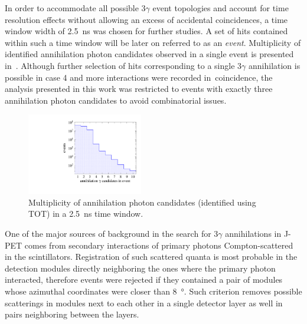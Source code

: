 In order to accommodate all possible $3\gamma$ event topologies and account for time resolution effects without allowing an excess of accidental coincidences, a time window width of 2.5~ns was chosen for further studies. A set of hits contained within such a time window will be later on referred to as an \textit{event}. Multiplicity of identified annihilation photon candidates observed in a single event is presented in~. Although further selection of hits corresponding to a single $3\gamma$ annihilation
is possible
in case 4 and more interactions were recorded in~coincidence,
the analysis presented in this work was restricted to events with exactly three annihilation photon candidates to avoid combinatorial issues.
\begin{figure}[h!]
  \centering
  \includegraphics[width=0.45\textwidth]{Chapter8_analysis_jpet/img/anh_candidates}
  \caption{Multiplicity of annihilation photon candidates (identified using TOT) in a 2.5~ns time window.}\label{fig:hit_multiplicity}
\end{figure}

One of the major sources of background in the search for 3$\gamma$ annihilations in J-PET comes from secondary interactions of primary photons Compton-scattered in the scintillators. Registration of such scattered quanta is most probable in the detection modules directly neighboring the ones where the primary photon interacted, therefore events were rejected if they contained a pair of modules whose azimuthal coordinates were closer than \SI{8}{\degree}. Such criterion removes possible scatterings in modules next to each other in a single detector layer as well in pairs neighboring between the layers.

